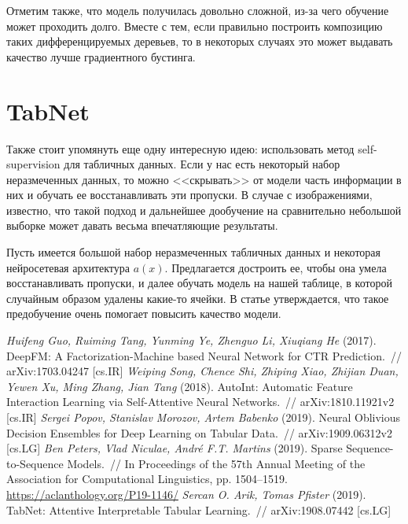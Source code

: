 \documentclass[12pt,fleqn]{article}
\begin{document}
Отметим также, что модель получилась довольно сложной, из-за чего обучение может проходить долго. Вместе с тем, если правильно построить композицию таких дифференцируемых деревьев, то в некоторых случаях это может выдавать качество лучше градиентного бустинга.

\section{TabNet}
Также стоит упомянуть еще одну интересную идею: использовать метод self-supervision для табличных данных. Если у нас есть некоторый набор неразмеченных данных, то можно <<скрывать>> от модели часть информации в них и обучать ее восстанавливать эти пропуски. В случае с изображениями, известно, что такой подход и дальнейшее дообучение на сравнительно небольшой выборке может давать весьма впечатляющие результаты.

Пусть имеется большой набор неразмеченных табличных данных и некоторая нейросетевая архитектура $ a(x) $. Предлагается достроить ее, чтобы она умела восстанавливать пропуски, и далее обучать модель на нашей таблице, в которой случайным образом удалены какие-то ячейки. В статье \cite{tabnet} утверждается, что такое предобучение очень помогает повысить качество модели.


\begin{thebibliography}{1}
	\emph{Huifeng Guo, Ruiming Tang, Yunming Ye, Zhenguo Li, Xiuqiang He} (2017).
	DeepFM: A Factorization-Machine based Neural Network for CTR Prediction.~//
	arXiv:1703.04247 [cs.IR]
	\emph{Weiping Song, Chence Shi, Zhiping Xiao, Zhijian Duan, Yewen Xu, Ming Zhang, Jian Tang} (2018).
	AutoInt: Automatic Feature Interaction Learning via Self-Attentive Neural Networks.~//
	arXiv:1810.11921v2 [cs.IR]
	\emph{Sergei Popov, Stanislav Morozov, Artem Babenko} (2019).
	Neural Oblivious Decision Ensembles for Deep Learning on Tabular Data.~//
	arXiv:1909.06312v2 [cs.LG]
	\emph{Ben Peters, Vlad Niculae, André F.T. Martins} (2019).
	Sparse Sequence-to-Sequence Models.~//
	In Proceedings of the 57th Annual Meeting of the Association for Computational Linguistics, pp. 1504--1519. \url{https://aclanthology.org/P19-1146/}
	\emph{Sercan O. Arik, Tomas Pfister} (2019).
	TabNet: Attentive Interpretable Tabular Learning.~//
	arXiv:1908.07442 [cs.LG]
\end{thebibliography}
\end{document}
